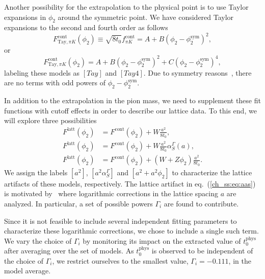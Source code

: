 Another possibility for the extrapolation to the physical point is to use Taylor expansions in $\phi_2$ around the symmetric point. We have considered Taylor expansions to the second and fourth order as follows
\begin{equation}
\label{ch_ss:eq:Tay}
F_{\textrm{Tay},\pi K}^{\textrm{cont}}(\phi_2)\equiv\sqrt{8t_0}f_{\pi K}^{\textrm{cont}}=A+B\left(\phi_2-\phi_2^{\textrm{sym}}\right)^2,
\end{equation}
or
\begin{equation}
\label{ch_ss:eq:Tay4}
F_{\textrm{Tay},\pi K}^{\textrm{cont}}(\phi_2)=A+B\left(\phi_2-\phi_2^{\textrm{sym}}\right)^2+C\left(\phi_2-\phi_2^{\textrm{sym}}\right)^4,
\end{equation}
labeling these models as $[Tay]$ and $[Tay4]$. Due to symmetry reasons~\citep{Bietenholz:2011qq}, there are no terms with odd powers of $\phi_2-\phi_2^{\textrm{sym}}$.

In addition to the extrapolation in the pion mass, we need to supplement these fit functions with cutoff effects in order to describe our lattice data. To this end, we will explore three possibilities
\begin{align}
\label{ch_ss:eq:a2}
F^{\textrm{latt}}(\phi_2)&=F^{\textrm{cont}}(\phi_2)+W\frac{a^2}{8t_0},\\
\label{ch_ss:eq:aas}
F^{\textrm{latt}}(\phi_2)&=F^{\textrm{cont}}(\phi_2)+W\frac{a^2}{8t_0}\alpha_S^{\Gamma}(a),\\
\label{ch_ss:eq:a2phi2}
F^{\textrm{latt}}(\phi_2)&=F^{\textrm{cont}}(\phi_2)+\left(W+Z\phi_2\right)\frac{a^2}{8t_0}.
\end{align}
We assign the labels $[a^2]$, $[a^2\alpha_S^{\Gamma}]$ and $[a^2+a^2\phi_2]$ to characterize the lattice artifacts of these models, respectively. The lattice artifact in eq.~(\ref{ch_ss:eq:aas}) is motivated by~\citep{Husung:2022kvi} where logarithmic corrections in the lattice spacing $a$ are analyzed. In particular, a set of possible powers $\Gamma_i$ are found to contribute. 

Since it is not feasible to include several independent fitting parameters to characterize these logarithmic corrections, we chose to include a single such term. We vary the choice of $\Gamma_i$ by monitoring its impact on the extracted value of $t_0^{\textrm{phys}}$ after averaging over the set of models. As $t_0^{\textrm{phys}}$ is observed to be independent of the choice of $\Gamma_i$, we restrict ourselves to the smallest value, $\Gamma_i=-0.111$, in the model average. 


